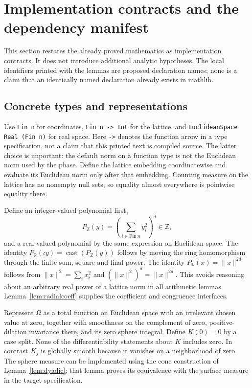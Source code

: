 \documentclass[11pt,oneside]{article}
\theoremstyle{definition}\newtheorem{definition}[theorem]{Definition}
\theoremstyle{remark}\newtheorem{remark}[theorem]{Remark}
\newcommand{\R}{\mathbb R}\newcommand{\Z}{\mathbb Z}\newcommand{\N}{\mathbb N}\newcommand{\Q}{\mathbb Q}\newcommand{\C}{\mathbb C}\newcommand{\T}{\mathbb T}
\newcommand{\ml}[1]{{\normalfont\small\nolinkurl{#1}}}
\begin{document}
\section{Implementation contracts and the dependency manifest}\label{sec:implementation}
This section restates the already proved mathematics as implementation
contracts. It does not introduce additional analytic hypotheses. The local
identifiers printed with the lemmas are proposed declaration names; none is
a claim that an identically named declaration already exists in mathlib.

\subsection{Concrete types and representations}
Use \ml{Fin n} for coordinates, \ml{Fin n -> Int} for the lattice, and
\ml{EuclideanSpace Real (Fin n)} for real space. Here \ml{->} denotes the function arrow in a type specification,
not a claim that this printed text is compiled source. The latter
choice is important: the default norm on a function type is not the
Euclidean norm used by the phase. Define the lattice embedding coordinatewise
and evaluate its Euclidean norm only after that embedding. Counting measure
on the lattice has no nonempty null sets, so equality almost everywhere is
pointwise equality there.

Define an integer-valued polynomial first,
\[
 P_\Z(y)=\left(\sum_{i\in\mathrm{Fin}\ n} y_i^2\right)^d\in\Z,
\]
and a real-valued polynomial by the same expression on Euclidean space.
The identity $P_\R(\iota y)=\operatorname{cast}(P_\Z(y))$ follows by moving
the ring homomorphism through the finite sum, square and final power.
The identity $P_\R(x)=\|x\|^{2d}$ follows from
$\|x\|^2=\sum_i x_i^2$ and $(\|x\|^2)^d=\|x\|^{2d}$.
This avoids reasoning about an arbitrary real power of a lattice norm in
all arithmetic lemmas. Lemma~\ref{lem:radialcoeff} supplies the coefficient
and congruence interfaces.

Represent $\Omega$ as a total function on Euclidean space with an irrelevant
chosen value at zero, together with smoothness on the complement of zero,
positive-dilation invariance there, and its zero sphere integral. Define
$K(0)=0$ by a case split. None of the differentiability statements about $K$
includes zero. In contrast $K_j$ is globally smooth because it vanishes on a
neighborhood of zero. The sphere measure can be implemented using the cone
construction of Lemma~\ref{lem:dyadic}; that lemma proves its equivalence with
the surface measure in the target specification.
\end{document}

